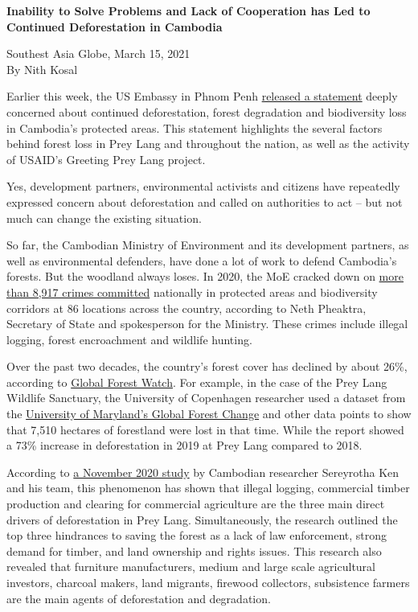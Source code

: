 \documentclass[10pt,a4paper]{letter}
\begin{document}
	
{\Large 
	\textbf{Inability to Solve Problems and Lack of Cooperation has Led to Continued Deforestation in Cambodia}
} 

Southest Asia Globe, March 15, 2021 \\
By Nith Kosal

Earlier this week, the US Embassy in Phnom Penh \href{https://kh.usembassy.gov/u-s-embassy-phnom-penh-cambodia-statement-on-prey-lang-wildlife-sanctuary/}{released a statement} deeply concerned about continued deforestation, forest degradation and biodiversity loss in Cambodia's protected areas. This statement highlights the several factors behind forest loss in Prey Lang and throughout the nation, as well as the activity of USAID's Greeting Prey Lang project.

Yes, development partners, environmental activists and citizens have repeatedly expressed concern about deforestation and called on authorities to act -- but not much can change the existing situation.

So far, the Cambodian Ministry of Environment and its development partners, as well as environmental defenders, have done a lot of work to defend Cambodia's forests. But the woodland always loses. In 2020, the MoE cracked down on \href{https://thmeythmey.com/?page=detail&id=100708}{more than 8,917 crimes committed} nationally in protected areas and biodiversity corridors at 86 locations across the country, according to Neth Pheaktra, Secretary of State and spokesperson for the Ministry. These crimes include illegal logging, forest encroachment and wildlife hunting.

Over the past two decades, the country's forest cover has declined by about 26\%, according to \href{https://www.globalforestwatch.org/dashboards/country/KHM/}{Global Forest Watch}. For example, in the case of the Prey Lang Wildlife Sanctuary, the University of Copenhagen researcher used a dataset from the \href{https://www.voacambodia.com/a/govt-usaid-criticized-for-inaction-over-severe-forest-loss-at-prey-lang-sanctuary/5478565.html}{University of Maryland's Global Forest Change} and other data points to show that 7,510 hectares of forestland were lost in that time. While the report showed a 73\% increase in deforestation in 2019 at Prey Lang compared to 2018.

According to \href{https://link.springer.com/chapter/10.1007/978-3-030-62509-2_8}{a November 2020 study} by Cambodian researcher Sereyrotha Ken and his team, this phenomenon has shown that illegal logging, commercial timber production and clearing for commercial agriculture are the three main direct drivers of deforestation in Prey Lang. Simultaneously, the research outlined the top three hindrances to saving the forest as a lack of law enforcement, strong demand for timber, and land ownership and rights issues. This research also revealed that furniture manufacturers, medium and large scale agricultural investors, charcoal makers, land migrants, firewood collectors, subsistence farmers are the main agents of deforestation and degradation.
\end{document}
